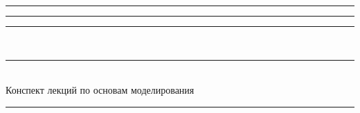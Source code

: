 \documentclass[12pt,chapters,notitlepage,pscyr]{hedwork}
\begin{document}
  \begin{titlepage}
    \vspace*{\fill}
    \center
    \Large
    \rule[.5ex]{8em}{.5pt} \decothreeleft \rule{1em}{0pt}
    \decosix \rule{1em}{0pt}
    \decothreeright\ \rule[.5ex]{8em}{.5pt} \\[2ex]
    
    Конспект лекций по основам моделирования \\[1.5ex]
    
    \rule{22.2em}{.5pt}
    \vspace*{\fill}
  \end{titlepage}
  
  
\end{document}
